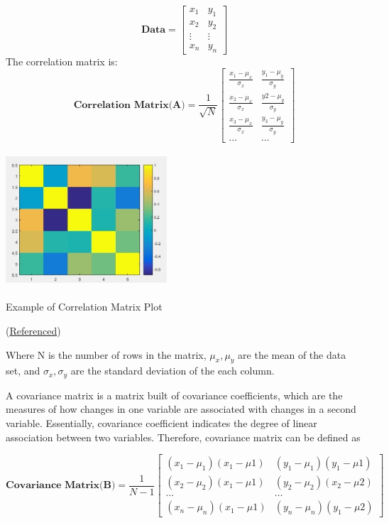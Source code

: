 \documentclass{tufte-handout}
\begin{document}
\[
\textbf{Data} = 
\begin{bmatrix}
    x_{1} & y_{1}  \\
    x_{2} & y_{2}  \\
    \vdots & \vdots \\
    x_{n} & y_{n} 
\end{bmatrix}
\]
The correlation matrix is:
\[
\textbf{Correlation Matrix(A)}= 
\frac{1}{\sqrt{N}}
\begin{bmatrix}
    \frac{x_{1}-\mu_{x}}{\sigma_{x}}  & \frac{y_{1}-\mu_{y}}{\sigma_{y}} \\
    \frac{x_{2}-\mu_{x}}{\sigma_{x}} & \frac{y{2}-\mu_{y}}{\sigma_{y}} \\
    \frac{x_{3}-\mu_{x}}{\sigma_{x}} & \frac{y_{3}-\mu_{y}}{\sigma_{y}} \\
    \dots  & \dots
\end{bmatrix}
\]
\begin{marginfigure}
    \centering
    \includegraphics[width = 6cm, height = 5cm]{correlation.jpg}
    \label{fig:corr}
\caption{Example of Correlation Matrix Plot}
(\href{https://www.quora.com/Whats-the-best-way-to-visualize-correlations-between-six-value-vectors}{Referenced})


\end{marginfigure}

Where N is the number of rows in the matrix, $\mu_{x}, \mu_{y}$ are the mean of the data set, and $\sigma_{x}, \sigma_{y}$ are the standard deviation of the each column. 

A covariance matrix is a matrix built of covariance coefficients, which are the measures of how changes in one variable are associated with changes in a second variable. Essentially, covariance coefficient indicates the degree of linear association between two variables. Therefore, covariance matrix can be defined as

\[
\textbf{Covariance Matrix(B)}= 
\frac{1}{N-1}
\begin{bmatrix}
    (x_{1}-\mu_{1})(x_{1}-\mu{1})  & (y_{1}-\mu_{1})(y_{1}-\mu{1}) \\
    (x_{2}-\mu_{2})(x_{1}-\mu{1}) & (y_{2}-\mu_{2})(x_{2}-\mu{2}) \\
        \dots  & \dots \\
    (x_{n}-\mu_{n})(x_{1}-\mu{1}) & (y_{n}-\mu_{n})(y_{1}-\mu{2}) 

\end{bmatrix}
\]
\end{document}
